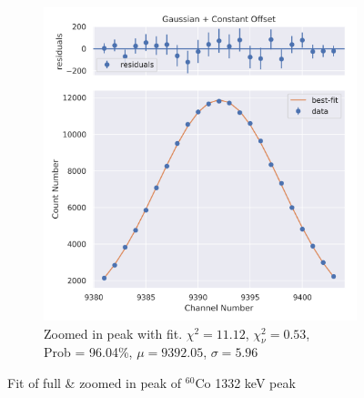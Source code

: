 \documentclass[11pt,a4paper]{article}
\newcommand{\element}[2]{$^{#2}\textrm{#1}$}
\begin{document}
\begin{figure}[H]
\begin{subfigure}{.5\linewidth}
    \includegraphics[width=\linewidth]{./Images/Cobalt60/Gauss/Gauss_2_Zoom.png}
    \caption{Zoomed in peak with fit. $\chi^2 = 11.12$, $\chi^2_\nu = 0.53$, \\ Prob = 96.04\%, $\mu = 9392.05$, $\sigma = 5.96$}
  \end{subfigure}
  \caption{Fit of full \& zoomed in peak of \element{Co}{60} 1332 keV peak}
\end{figure}
\clearpage
\end{document}
